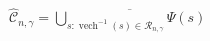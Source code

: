 \(\widehat{\mathcal C}_{n,\gamma}=\overline{\bigcup_{s:\operatorname{vech}^{-1}(s)\in\mathcal R_{n,\gamma}}\Psi(s)}\)